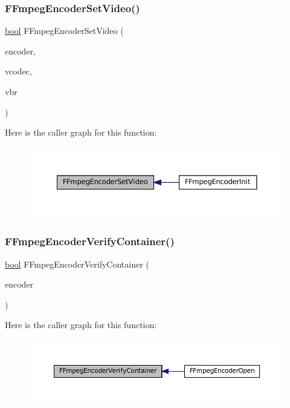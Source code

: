 \subsubsection{\texorpdfstring{F\+Fmpeg\+Encoder\+Set\+Video()}{FFmpegEncoderSetVideo()}}
{\footnotesize\ttfamily \mbox{\hyperlink{libretro_8h_a4a26dcae73fb7e1528214a068aca317e}{bool}} F\+Fmpeg\+Encoder\+Set\+Video (\begin{DoxyParamCaption}\item[{struct \mbox{\hyperlink{ffmpeg-encoder_8h_struct_f_fmpeg_encoder}{F\+Fmpeg\+Encoder}} $\ast$}]{encoder,  }\item[{const char $\ast$}]{vcodec,  }\item[{unsigned}]{vbr }\end{DoxyParamCaption})}

Here is the caller graph for this function\+:
\nopagebreak
\begin{figure}[H]
\begin{center}
\leavevmode
\includegraphics[width=350pt]{ffmpeg-encoder_8c_a0812bb2471d9e5f5f220531bb1074798_icgraph}
\end{center}
\end{figure}
\mbox{\label{ffmpeg-encoder_8c_a57dc90db7ec7abc72021c7faf1173e01}} 
\subsubsection{\texorpdfstring{F\+Fmpeg\+Encoder\+Verify\+Container()}{FFmpegEncoderVerifyContainer()}}
{\footnotesize\ttfamily \mbox{\hyperlink{libretro_8h_a4a26dcae73fb7e1528214a068aca317e}{bool}} F\+Fmpeg\+Encoder\+Verify\+Container (\begin{DoxyParamCaption}\item[{struct \mbox{\hyperlink{ffmpeg-encoder_8h_struct_f_fmpeg_encoder}{F\+Fmpeg\+Encoder}} $\ast$}]{encoder }\end{DoxyParamCaption})}

Here is the caller graph for this function\+:
\nopagebreak
\begin{figure}[H]
\begin{center}
\leavevmode
\includegraphics[width=350pt]{ffmpeg-encoder_8c_a57dc90db7ec7abc72021c7faf1173e01_icgraph}
\end{center}
\end{figure}
